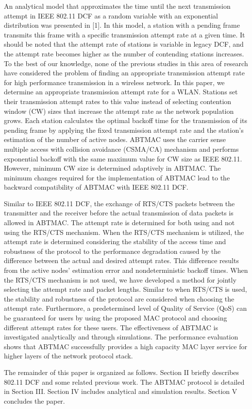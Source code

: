 \documentclass[10pt,twocolumn,oneside,submit]{JCNtran}
\begin{document}
\par An analytical model that approximates the time until the next transmission attempt in IEEE 802.11 DCF as a random variable with an exponential distribution was presented in [1]. In this model, a station with a pending frame transmits this frame with a specific transmission attempt rate at a given time. It should be noted that the attempt rate of stations is variable in legacy DCF, and the attempt rate becomes higher as the number of contending stations increases. To the best of our knowledge, none of the previous studies in this area of research have considered the problem of finding an appropriate transmission attempt rate for high performance transmission in a wireless network. In this paper, we determine an appropriate transmission attempt rate for a WLAN. Stations set their transmission attempt rates to this value instead of selecting contention window (CW) sizes that increase the attempt rate as the network population grows. Each station calculates the optimal backoff time for the transmission of its pending frame by applying the fixed transmission attempt rate and the station's estimation of the number of active nodes. ABTMAC uses the carrier sense multiple access with collision avoidance (CSMA/CA) mechanism and performs exponential backoff with the same maximum value for CW size as IEEE 802.11. However, minimum CW size is determined adaptively in ABTMAC. The minimum changes required for the implementation of ABTMAC lead to the backward compatibility of ABTMAC with IEEE 802.11 DCF.
\par Similar to IEEE 802.11 DCF, the exchange of RTS/CTS packets between the transmitter and the receiver before the actual transmission of data packets is allowed in ABTMAC. The attempt rate is determined for both using and not using the RTS/CTS mechanism. When the RTS/CTS mechanism is utilized, the attempt rate is determined considering the stability of the access time and robustness of the protocol to the performance degradation caused by the difference between the actual and desired attempt rates. This difference results from the active nodes' estimation error and nondeterministic backoff times. When the RTS/CTS mechanism is not used, we have developed a method for jointly selecting the attempt rate and packet lengths. Similar to when RTS/CTS is used, the stability and robustness of the protocol are considered when choosing the attempt rate. Furthermore, a predetermined level of Quality of Service (QoS) can be guaranteed for users by using the proposed MAC protocol and choosing different attempt rates for these users. The effectiveness of ABTMAC is investigated analytically and through simulations. The performance evaluation shows that ABTMAC successfully provides a high capacity MAC layer service for higher layers of the network protocol stack. 
\par The remainder of this paper is organized as follows. Section II briefly describes 802.11 DCF and some related previous work. The ABTMAC protocol is detailed in Section III. Section IV includes analytical and simulation results. Section V concludes the paper.
\end{document}
